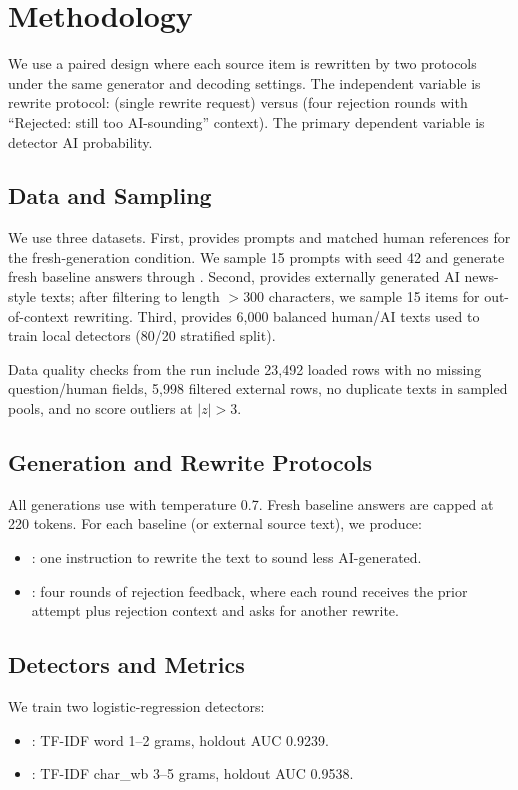 \section{Methodology}
\label{sec:methodology}

 We use a paired design where each source item is rewritten by two protocols under the same generator and decoding settings. The independent variable is rewrite protocol: \oneshot (single rewrite request) versus \iterative (four rejection rounds with ``Rejected: still too AI-sounding'' context). The primary dependent variable is detector AI probability.

\subsection{Data and Sampling}
We use three datasets. First, \hcthree provides prompts and matched human references for the fresh-generation condition. We sample 15 prompts with seed 42 and generate fresh baseline answers through \gptmini. Second, \ghostbuster provides externally generated AI news-style texts; after filtering to length $>300$ characters, we sample 15 items for out-of-context rewriting. Third, \aitextpile provides 6{,}000 balanced human/AI texts used to train local detectors (80/20 stratified split).

Data quality checks from the run include 23{,}492 loaded \hcthree rows with no missing question/human fields, 5{,}998 filtered external rows, no duplicate texts in sampled pools, and no score outliers at $|z|>3$.

\subsection{Generation and Rewrite Protocols}
All generations use \gptmini with temperature 0.7. Fresh baseline answers are capped at 220 tokens. For each baseline (or external source text), we produce:
\begin{itemize}[leftmargin=*,itemsep=0pt,topsep=0pt]
    \item \oneshot: one instruction to rewrite the text to sound less AI-generated.
    \item \iterative: four rounds of rejection feedback, where each round receives the prior attempt plus rejection context and asks for another rewrite.
\end{itemize}

\subsection{Detectors and Metrics}
We train two logistic-regression detectors:
\begin{itemize}[leftmargin=*,itemsep=0pt,topsep=0pt]
    \item \worddet: TF-IDF word 1--2 grams, holdout AUC 0.9239.
    \item \styledet: TF-IDF char\_wb 3--5 grams, holdout AUC 0.9538.
\end{itemize}

